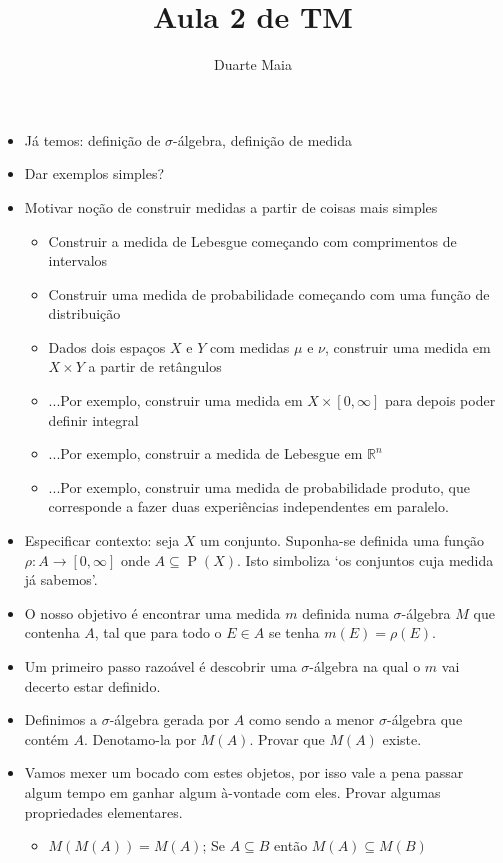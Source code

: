 \documentclass{article}
\title{Aula 2 de TM}
\author{Duarte Maia}
\date{}
\newcommand{\R}{\mathbb{R}}
\DeclareMathOperator{\ps}{P}
\begin{document}
\maketitle

\begin{itemize}
\item Já temos: definição de $\sigma$-álgebra, definição de medida
\item Dar exemplos simples?
\item Motivar noção de construir medidas a partir de coisas mais simples
\begin{itemize}
\item Construir a medida de Lebesgue começando com comprimentos de intervalos
\item Construir uma medida de probabilidade começando com uma função de distribuição
\item Dados dois espaços $X$ e $Y$ com medidas $\mu$ e $\nu$, construir uma medida em $X \times Y$ a partir de retângulos
\item ...Por exemplo, construir uma medida em $X \times \left[0,\infty\right]$ para depois poder definir integral
\item ...Por exemplo, construir a medida de Lebesgue em $\R^n$
\item ...Por exemplo, construir uma medida de probabilidade produto, que corresponde a fazer duas experiências independentes em paralelo.
\end{itemize}
\item Especificar contexto: seja $X$ um conjunto. Suponha-se definida uma função $\rho : A \to [0,\infty]$ onde $A \subseteq \ps(X)$. Isto simboliza `os conjuntos cuja medida já sabemos'.
\item O nosso objetivo é encontrar uma medida $m$ definida numa $\sigma$-álgebra $M$ que contenha $A$, tal que para todo o $E \in A$ se tenha $m(E) = \rho(E)$.
\item Um primeiro passo razoável é descobrir uma $\sigma$-álgebra na qual o $m$ vai decerto estar definido.
\item Definimos a $\sigma$-álgebra gerada por $A$ como sendo a menor $\sigma$-álgebra que contém $A$. Denotamo-la por $M(A)$. Provar que $M(A)$ existe.
\item Vamos mexer um bocado com estes objetos, por isso vale a pena passar algum tempo em ganhar algum à-vontade com eles. Provar algumas propriedades elementares.
\begin{itemize}
\item $M(M(A)) = M(A)$; Se $A \subseteq B$ então $M(A) \subseteq M(B)$

\end{itemize}
\end{itemize}
\end{document}
